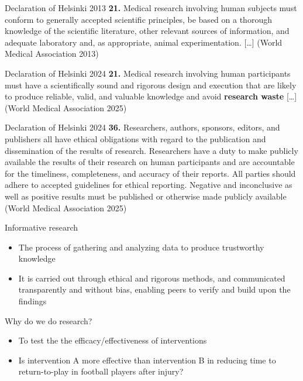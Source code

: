 \documentclass[
  ignorenonframetext,
]{beamer}
\begin{document}
\begin{frame}{Declaration of Helsinki 2013}
\protect{}\label{declaration-of-helsinki-2013-1}
\textbf{21.} Medical research involving human subjects must conform to
generally accepted scientific principles, be based on a thorough
knowledge of the scientific literature, other relevant sources of
information, and adequate laboratory and, as appropriate, animal
experimentation. {[}\ldots{]} (World Medical Association 2013)
\end{frame}

\begin{frame}{Declaration of Helsinki 2024}
\protect{}\label{declaration-of-helsinki-2024}
\textbf{21.} Medical research involving human participants must have a
scientifically sound and rigorous design and execution that are likely
to produce reliable, valid, and valuable knowledge and avoid
\textbf{research waste} {[}\ldots{]} (World Medical Association 2025)
\end{frame}

\begin{frame}{Declaration of Helsinki 2024}
\protect{}\label{declaration-of-helsinki-2024-1}
\textbf{36.} Researchers, authors, sponsors, editors, and publishers all
have ethical obligations with regard to the publication and
dissemination of the results of research. Researchers have a duty to
make publicly available the results of their research on human
participants and are accountable for the timeliness, completeness, and
accuracy of their reports. All parties should adhere to accepted
guidelines for ethical reporting. Negative and inconclusive as well as
positive results must be published or otherwise made publicly available
(World Medical Association 2025)
\end{frame}

\begin{frame}{Informative research}
\protect{}\label{informative-research}
\begin{itemize}
\item
  The process of gathering and analyzing data to produce trustworthy
  knowledge
\item
  It is carried out through ethical and rigorous methods, and
  communicated transparently and without bias, enabling peers to verify
  and build upon the findings
\end{itemize}
\end{frame}

\begin{frame}{Why do we do research?}
\protect{}\label{why-do-we-do-research}
\begin{itemize}
\item
  To test the the efficacy/effectiveness of interventions
\item
  Is intervention A more effective than intervention B in reducing time
  to return-to-play in football players after injury?
\end{itemize}
\end{frame}
\end{document}
